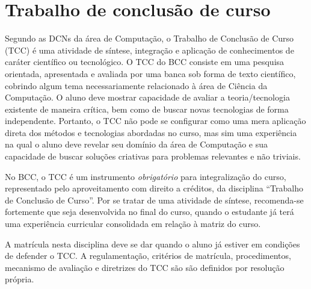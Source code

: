 \section{Trabalho de conclusão de curso}
\label{sec:trabalho_conclusao_curso}

Segundo as DCNs da área de Computação, o Trabalho de Conclusão de Curso (TCC) é
uma atividade de síntese, integração e aplicação de conhecimentos de caráter
científico ou tecnológico. 
O TCC do BCC consiste em uma pesquisa orientada, apresentada e avaliada por uma
banca sob forma de texto científico, cobrindo algum tema necessariamente relacionado à
área de Ciência da Computação.
O aluno deve mostrar capacidade de avaliar a teoria/tecnologia existente de
maneira crítica, bem como de buscar novas tecnologias de forma independente.
Portanto, o TCC não pode se configurar como uma mera aplicação direta dos
métodos e tecnologias abordadas no curso, mas sim uma experiência na qual o
aluno deve revelar seu domínio da área de Computação e sua capacidade de buscar
soluções criativas para problemas relevantes e não triviais.


No BCC, o TCC é um instrumento \textit{obrigatório} para
integralização do curso, representado pelo aproveitamento com direito
a créditos, da disciplina ``Trabalho de Conclusão de Curso''. Por se
tratar de uma atividade de síntese, recomenda-se fortemente que seja
desenvolvida no final do curso, quando o estudante já terá uma
experiência curricular consolidada em relação à matriz do curso.

A matrícula nesta disciplina deve se dar quando o aluno já estiver em
condições de defender o TCC. A regulamentação, critérios de matrícula,
procedimentos, mecanismo de avaliação e diretrizes do TCC são são
definidos por resolução própria.
